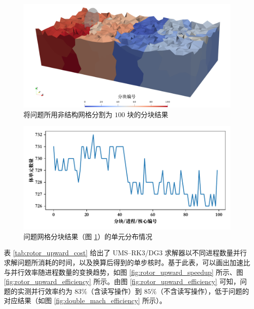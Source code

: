\begin{figure}[h!]
\begin{centering}
\includegraphics[width=1\textwidth,height=0.4\textheight,keepaspectratio]{figures/upward/partition}
\par\end{centering}
\caption{\label{fig:rotor_upward_partition}将问题所用非结构网格分割为
$100$ 块的分块结果}
\end{figure}

\begin{figure}[h!]
\begin{centering}
\includegraphics[width=1\textwidth,height=0.3\textheight,keepaspectratio]{figures/upward/balance}
\par\end{centering}
\caption{\label{fig:rotor_upward_balance}问题网格分块结果（图
\ref{fig:rotor_upward_partition}）的单元分布情况}
\end{figure}

表 \ref{tab:rotor_upward_cost} 给出了 UMS–RK3/DG3 求解器以不同进程数量并行求解问题所消耗的时间，以及换算后得到的单步核时。基于此表，可以画出加速比与并行效率随进程数量的变换趋势，如图
\ref{fig:rotor_upward_speedup} 所示、图 \ref{fig:rotor_upward_efficiency}
所示。由图 \ref{fig:rotor_upward_efficiency} 可知，问题的实测并行效率约为
$83\%$（含读写操作）到 $85\%$（不含读写操作），低于问题的对应结果（如图
\ref{fig:double_mach_efficiency} 所示）。 

